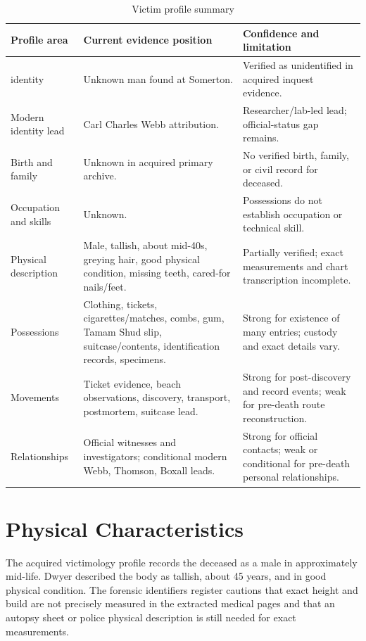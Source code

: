 \begin{table}[htbp]
\centering
\caption{Victim profile summary}
\label{tab:victim-profile-summary}
\begin{tabularx}{\textwidth}{>{\raggedright\arraybackslash}p{}>{\raggedright\arraybackslash}p{}>{\raggedright\arraybackslash}X}
\toprule
Profile area & Current evidence position & Confidence and limitation \\
\midrule
1949 identity & Unknown man found at Somerton. & Verified as unidentified in acquired inquest evidence. \\
Modern identity lead & Carl Charles Webb attribution. & Researcher/lab-led lead; official-status gap remains. \\
Birth and family & Unknown in acquired primary archive. & No verified birth, family, or civil record for deceased. \\
Occupation and skills & Unknown. & Possessions do not establish occupation or technical skill. \\
Physical description & Male, tallish, about mid-40s, greying hair, good physical condition, missing teeth, cared-for nails/feet. & Partially verified; exact measurements and chart transcription incomplete. \\
Possessions & Clothing, tickets, cigarettes/matches, combs, gum, Tamam Shud slip, suitcase/contents, identification records, specimens. & Strong for existence of many entries; custody and exact details vary. \\
Movements & Ticket evidence, beach observations, discovery, transport, postmortem, suitcase lead. & Strong for post-discovery and record events; weak for pre-death route reconstruction. \\
Relationships & Official witnesses and investigators; conditional modern Webb, Thomson, Boxall leads. & Strong for official contacts; weak or conditional for pre-death personal relationships. \\
\bottomrule
\end{tabularx}
\end{table}

\section{Physical Characteristics}

The acquired victimology profile records the deceased as a male in approximately mid-life. Dwyer described the body as tallish, about 45 years, and in good physical condition. The forensic identifiers register cautions that exact height and build are not precisely measured in the extracted medical pages and that an autopsy sheet or police physical description is still needed for exact measurements.

